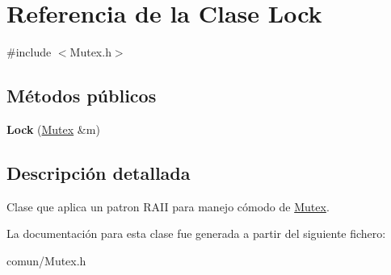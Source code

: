 \hypertarget{classLock}{\section{\-Referencia de la \-Clase \-Lock}
\label{classLock}
}


{\ttfamily \#include $<$\-Mutex.\-h$>$}

\subsection*{\-Métodos públicos}
\begin{DoxyCompactItemize}
\item 
\hypertarget{classLock_a2c786576eddddb484a6a02a7dea52904}{{\bfseries \-Lock} (\hyperlink{classMutex}{\-Mutex} \&m)}\label{classLock_a2c786576eddddb484a6a02a7dea52904}

\end{DoxyCompactItemize}


\subsection{\-Descripción detallada}
\-Clase que aplica un patron \-R\-A\-I\-I para manejo cómodo de \hyperlink{classMutex}{\-Mutex}. 

\-La documentación para esta clase fue generada a partir del siguiente fichero\-:\begin{DoxyCompactItemize}
\item 
comun/\-Mutex.\-h\end{DoxyCompactItemize}

